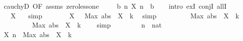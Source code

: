 \begin{isabellebody}
\ cauchyD\ {\isacharbrackleft}{\kern0pt}OF\ assms\ zero{\isacharunderscore}{\kern0pt}less{\isacharunderscore}{\kern0pt}one{\isacharbrackright}{\kern0pt}\ \isacommand{{\isachardot}{\kern0pt}{\isachardot}{\kern0pt}}\isamarkupfalse%
\isanewline
\ \ \isamarkupfalse%
\ {\isachardoublequoteopen}{\isasymexists}b{\isachargreater}{\kern0pt}{}{\isachardot}{\kern0pt}\ {\isasymforall}n{\isachardot}{\kern0pt}\ {\isasymbar}X\ n{\isasymbar}\ {\isacharless}{\kern0pt}\ b{\isachardoublequoteclose}\isanewline
\ \ \isamarkupfalse%
\ {\isacharparenleft}{\kern0pt}intro\ exI\ conjI\ allI{\isacharparenright}{\kern0pt}\isanewline
\ \ \ \ \isamarkupfalse%
\ {\isachardoublequoteopen}{}\ {\isasymle}\ {\isasymbar}X\ {}{\isasymbar}{\isachardoublequoteclose}\ \isamarkupfalse%
\ simp\isanewline
\ \ \ \ \isamarkupfalse%
\ \isamarkupfalse%
\ {\isachardoublequoteopen}{\isasymbar}X\ {}{\isasymbar}\ {\isasymle}\ Max\ {\isacharparenleft}{\kern0pt}abs\ {\isacharbackquote}{\kern0pt}\ X\ {\isacharbackquote}{\kern0pt}\ {\isacharbraceleft}{\kern0pt}{\isachardot}{\kern0pt}{\isachardot}{\kern0pt}k{\isacharbraceright}{\kern0pt}{\isacharparenright}{\kern0pt}{\isachardoublequoteclose}\ \isamarkupfalse%
\ simp\isanewline
\ \ \ \ \isamarkupfalse%
\ \isamarkupfalse%
\ {\isachardoublequoteopen}{}\ {\isasymle}\ Max\ {\isacharparenleft}{\kern0pt}abs\ {\isacharbackquote}{\kern0pt}\ X\ {\isacharbackquote}{\kern0pt}\ {\isacharbraceleft}{\kern0pt}{\isachardot}{\kern0pt}{\isachardot}{\kern0pt}k{\isacharbraceright}{\kern0pt}{\isacharparenright}{\kern0pt}{\isachardoublequoteclose}\ \isacommand{{\isachardot}{\kern0pt}}\isamarkupfalse%
\isanewline
\ \ \ \ \isamarkupfalse%
\ \isamarkupfalse%
\ {\isachardoublequoteopen}{}\ {\isacharless}{\kern0pt}\ Max\ {\isacharparenleft}{\kern0pt}abs\ {\isacharbackquote}{\kern0pt}\ X\ {\isacharbackquote}{\kern0pt}\ {\isacharbraceleft}{\kern0pt}{\isachardot}{\kern0pt}{\isachardot}{\kern0pt}k{\isacharbraceright}{\kern0pt}{\isacharparenright}{\kern0pt}\ {\isacharplus}{\kern0pt}\ {}{\isachardoublequoteclose}\ \isamarkupfalse%
\ simp\isanewline
\ \ \isamarkupfalse%
\isanewline
\ \ \ \ \isamarkupfalse%
\ n\ {\isacharcolon}{\kern0pt}{\isacharcolon}{\kern0pt}\ nat\isanewline
\ \ \ \ \isamarkupfalse%
\ {\isachardoublequoteopen}{\isasymbar}X\ n{\isasymbar}\ {\isacharless}{\kern0pt}\ Max\ {\isacharparenleft}{\kern0pt}abs\ {\isacharbackquote}{\kern0pt}\ X\ {\isacharbackquote}{\kern0pt}\ {\isacharbraceleft}{\kern0pt}{\isachardot}{\kern0pt}{\isachardot}{\kern0pt}k{\isacharbraceright}{\kern0pt}{\isacharparenright}{\kern0pt}\ {\isacharplus}{\kern0pt}\ {}{\isachardoublequoteclose}\isanewline

\end{isabellebody}
